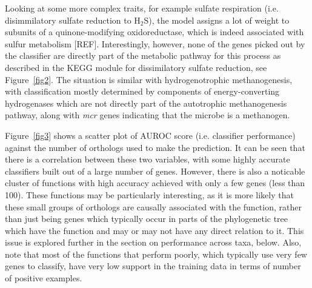 \documentclass[10pt,letterpaper]{article}
\begin{document}
Looking at some more complex traits, for example sulfate respiration (i.e. disimmilatory sulfate reduction to H$_{2}$S), the model assigns a lot of weight to subunits of a quinone-modifying oxidoreductase, which is indeed associated with sulfur metabolism [REF]. Interestingly, however, none of the genes picked out by the classifier are directly part of the metabolic pathway for this process as described in the KEGG module for dissimilatory sulfate reduction, see Figure~\ref{fig2}. The situation is similar with hydrogenotrophic methanogenesis, with classification mostly determined by components of energy-converting hydrogenases which are not directly part of the autotrophic methanogenesis pathway, along with \emph{mcr} genes indicating that the microbe is a methanogen.  

Figure~\ref{fig3} shows a scatter plot of AUROC score (i.e. classifier performance) against the number of orthologs used to make the prediction. It can be seen that there is a correlation between these two variables, with some highly accurate classifiers built out of a large number of genes. However, there is also a noticable cluster of functions with high accuracy achieved with only a few genes (less than 100). These functions may be particularly interesting, as it is more likely that these small groups of orthologs are causally associated with the function, rather than just being genes which typically occur in parts of the phylogenetic tree which have the function and may or may not have any direct relation to it. This issue is explored further in the section on performance across taxa, below. Also, note that most of the functions that perform poorly, which typically use very few genes to classify, have very low support in the training data in terms of number of positive examples.
\end{document}
